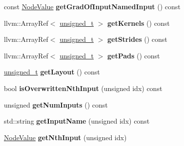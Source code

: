 \begin{DoxyCompactItemize}
const \hyperlink{structglow_1_1_node_value}{Node\+Value} {\bfseries get\+Grad\+Of\+Input\+Named\+Input} () const
\item 
\mbox{\label{classglow_1_1_avg_pool_grad_node_aed7c9d589ed023d45a79647bae988360}} 
llvm\+::\+Array\+Ref$<$ \hyperlink{namespaceglow_a0ca574644e1e42ef193a9947fb4d8911}{unsigned\+\_\+t} $>$ {\bfseries get\+Kernels} () const
\item 
\mbox{\label{classglow_1_1_avg_pool_grad_node_a18e2d400893907e42cb637dbcea307fe}} 
llvm\+::\+Array\+Ref$<$ \hyperlink{namespaceglow_a0ca574644e1e42ef193a9947fb4d8911}{unsigned\+\_\+t} $>$ {\bfseries get\+Strides} () const
\item 
\mbox{\label{classglow_1_1_avg_pool_grad_node_a276ea4770d896116602a5c2e454077e5}} 
llvm\+::\+Array\+Ref$<$ \hyperlink{namespaceglow_a0ca574644e1e42ef193a9947fb4d8911}{unsigned\+\_\+t} $>$ {\bfseries get\+Pads} () const
\item 
\mbox{\label{classglow_1_1_avg_pool_grad_node_af78aa34ba7f495d01f10f5c06134bad1}} 
\hyperlink{namespaceglow_a0ca574644e1e42ef193a9947fb4d8911}{unsigned\+\_\+t} {\bfseries get\+Layout} () const
\item 
\mbox{\label{classglow_1_1_avg_pool_grad_node_a19a190a057068e2a5301060d49c2db0d}} 
bool {\bfseries is\+Overwritten\+Nth\+Input} (unsigned idx) const
\item 
\mbox{\label{classglow_1_1_avg_pool_grad_node_a8decb50d311db42ec762eb7fff98bd66}} 
unsigned {\bfseries get\+Num\+Inputs} () const
\item 
\mbox{\label{classglow_1_1_avg_pool_grad_node_a6b0fcb6915b198e116314f7d270db68c}} 
std\+::string {\bfseries get\+Input\+Name} (unsigned idx) const
\item 
\mbox{\label{classglow_1_1_avg_pool_grad_node_a83e7547aecd6df721e0dd819abf1fce0}} 
\hyperlink{structglow_1_1_node_value}{Node\+Value} {\bfseries get\+Nth\+Input} (unsigned idx)
\item 

\end{DoxyCompactItemize}

